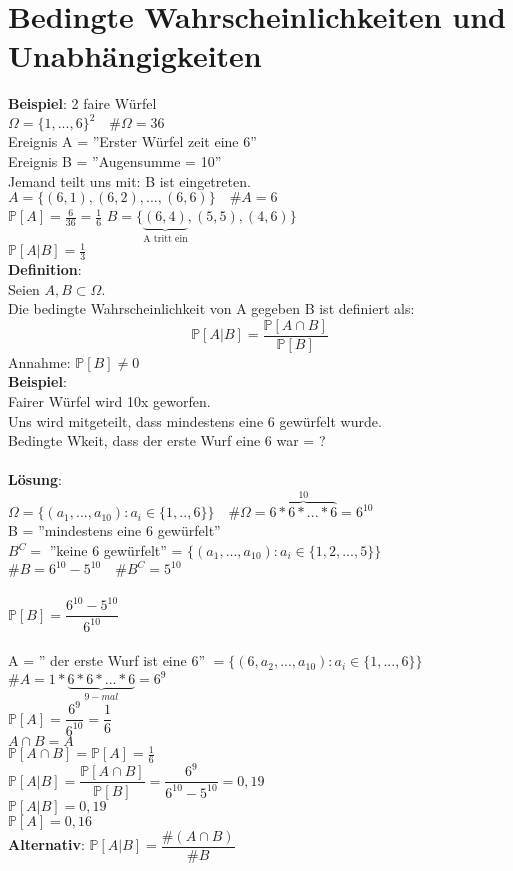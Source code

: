 \chapter{Bedingte Wahrscheinlichkeiten und Unabhängigkeiten}
\textbf{Beispiel}: 2 faire Würfel \medskip\\
$\Omega = \{1,...,6\}^2 \quad \#\Omega=36$\medskip\\
Ereignis A = ''Erster Würfel zeit eine 6''\\
Ereignis B = ''Augensumme = 10''\medskip\\
Jemand teilt uns mit: B ist eingetreten.\smallskip\\
$A=\{(6,1),(6,2),...,(6,6)\} \quad \#A =6$\medskip\\
$\mathds{P}[A] = \frac{6}{36}= \frac{1}{6}$
$B=\{\underbrace{(6,4)}_\text{A tritt ein},(5,5),(4,6)\}$\medskip\\
$\mathds{P}[A|B]= \frac{1}{3}$\medskip\\
\textbf{Definition}:\\
Seien $A,B \subset \Omega$.\medskip\\
Die bedingte Wahrscheinlichkeit von A gegeben B ist definiert als: $$\mathds{P}[A|B] = \dfrac{\mathds{P}[A \cap B]}{\mathds{P}[B]}$$
Annahme: $\mathds{P}[B] \neq 0$\medskip\\
\textbf{Beispiel}:\\ Fairer Würfel wird 10x geworfen.\\
Uns wird mitgeteilt, dass mindestens eine 6 gewürfelt wurde.\smallskip\\
Bedingte Wkeit, dass der erste Wurf eine 6 war = ?\\\\
\textbf{Lösung}:\\
$\Omega = \{(a_1,...,a_{10}):a_i \in \{1,..,6\}\} \quad \#\Omega = \overbrace{6*6*...*6}^{10} = 6^{10}$\medskip\\
B = ''mindestens eine 6 gewürfelt''\smallskip\\
$B^C =$ ''keine 6 gewürfelt'' =
$\{(a_1,...,a_10):a_i \in \{1,2,...,5\}\}$\medskip\\
$\#B = 6^{10}-5^{10} \quad \#B^C = 5^{10}$\\\\
$\mathds{P}[B] = \dfrac{6^{10}-5^{10}}{6^{10}}$\\\\
A = '' der erste Wurf ist eine 6'' $= \{(6,a_2,...,a_{10}):a_i \in \{1,...,6\}\}$\medskip\\
$\#A = 1*\underbrace{6*6*...*6}_{9-mal} = 6^9	$\smallskip\\
$\mathds{P}[A] = \dfrac{6^9}{6^{10}}= \dfrac{1}{6}$\medskip\\
$A\cap B = A$\smallskip\\
$\mathds{P}[A\cap B] = \mathds{P}[A]=\frac{1}{6}$\smallskip\\
$\mathds{P}[A  \vert B ] = \dfrac{\mathds{P}[A \cap B]}{\mathds{P}[B]} = \dfrac{6^9}{6^{10}-5^{10}} = 0,19$\medskip\\
$\mathds{P}[A\vert B] = 0,19$\smallskip\\
$\mathds{P}[A] = 0,16$\medskip\\
\textbf{Alternativ}: $\mathds{P}[A\vert B] = \dfrac{\#(A\cap B)}{\#B}$
